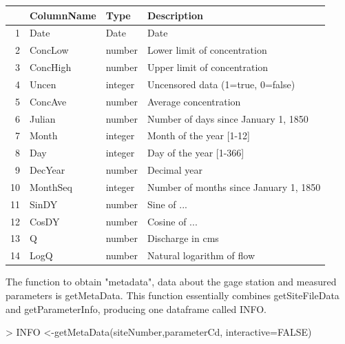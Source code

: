 \documentclass[a4paper,11pt]{article}
\begin{document}
\begin{tabular}{rlll}
  \hline
 & ColumnName & Type & Description \\ 
  \hline
1 & Date & Date & Date \\ 
  2 & ConcLow & number & Lower limit of concentration \\ 
  3 & ConcHigh & number & Upper limit of concentration \\ 
  4 & Uncen & integer & Uncensored data (1=true, 0=false) \\ 
  5 & ConcAve & number & Average concentration \\ 
  6 & Julian & number & Number of days since January 1, 1850 \\ 
  7 & Month & integer & Month of the year [1-12] \\ 
  8 & Day & integer & Day of the year [1-366] \\ 
  9 & DecYear & number & Decimal year \\ 
  10 & MonthSeq & integer & Number of months since January 1, 1850 \\ 
  11 & SinDY & number & Sine of ... \\ 
  12 & CosDY & number & Cosine of ... \\ 
  13 & Q & number & Discharge in cms \\ 
  14 & LogQ & number & Natural logarithm of flow \\ 
   \hline
\end{tabular}

The function to obtain "metadata", data about the gage station and measured parameters is getMetaData. This function essentially combines getSiteFileData and getParameterInfo, producing one dataframe called INFO.

\begin{Schunk}
\begin{Sinput}
> INFO <-getMetaData(siteNumber,parameterCd, interactive=FALSE)
\end{Sinput}
\end{Schunk}
\end{document}
